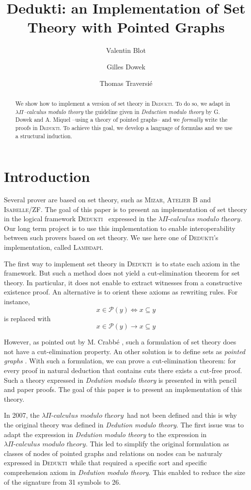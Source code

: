 \documentclass[submission,copyright,creativecommons]{eptcs}
\title{Dedukti: an Implementation of Set Theory with Pointed Graphs}
\author{Valentin Blot
\institute{Inria, France\\
LMF, ENS Paris-Saclay, France}
\email{valentin.blot@inria.fr}
\and
Gilles Dowek
\institute{Inria, France\\
LMF, ENS Paris-Saclay, France}
\email{gilles.dowek@ens-paris-saclay.fr}
\and
Thomas Traversié
\institute{CentraleSupélec, France}
\email{thomas.traversie@inria.fr}
}
\def\lra{\longrightarrow}
\newcommand{\dedukti}{\textsc{Dedukti}}
\newcommand{\lpcm}{$\lambda \Pi\textit{-calculus modulo theory}$}
\begin{document}
\maketitle

\begin{abstract}
We show how to implement a version of set theory in \dedukti. To do so, we adapt in $\lambda \Pi$\textit{--calculus modulo theory} the guideline given in \textit{Deduction modulo theory} by G. Dowek and A. Miquel --using a theory of pointed graphs-- and we \textit{formally} write the proofs in \dedukti. To achieve this goal, we develop a language of formulas and we use a structural induction.
\end{abstract}

\section{Introduction}

Several prover are based on set theory, such as \textsc{Mizar}, \textsc{Atelier B} and \textsc{Isabelle/ZF}. The goal of this paper is to present an implementation of set theory in the logical framework \dedukti ~\cite{expressing} expressed in the \lpcm. Our long term project is to use this implementation to enable interoperability between such provers based on set theory. We use here one of \dedukti's implementation, called \textsc{Lambdapi}. 

The first way to implement set theory in \dedukti ~is to state each axiom in the framework. But such a method does not yield a cut-elimination theorem for set theory. In particular, it does not enable to extract witnesses from a constructive existence proof. An alternative is to orient these axioms as rewriting rules. For instance, $$x \in \mathcal{P}(y) \Leftrightarrow x \subseteq y$$ is replaced with $$x \in \mathcal{P}(y) \lra x \subseteq y$$

However, as pointed out by M. Crabbé \cite{crabbe}, such a formulation of set theory does not have a cut-elimination property. An other solution is to define sets as \textit{pointed graphs} \cite{pointed}. With such a formulation, we can prove a cut-elimination theorem: for every proof in natural deduction that contains cuts there exists a cut-free proof. Such a theory expressed in \textit{Dedution modulo theory} is presented in \cite{zermodulo} with pencil and paper proofs. The goal of this paper is to present an implementation of this theory.

In 2007, the \lpcm ~had not been defined and this is why the original theory was defined in \textit{Dedution modulo theory}. The first issue was to adapt the expression in \textit{Dedution modulo theory} to the expression in \lpcm. This led to simplify the original formulation as classes of nodes of pointed graphs and relations on nodes can be naturaly expressed in \dedukti ~while that required a specific sort and specific comprehension axiom in \textit{Dedution modulo theory}. This enabled to reduce the size of the signature from 31 symbols to 26.
\end{document}
